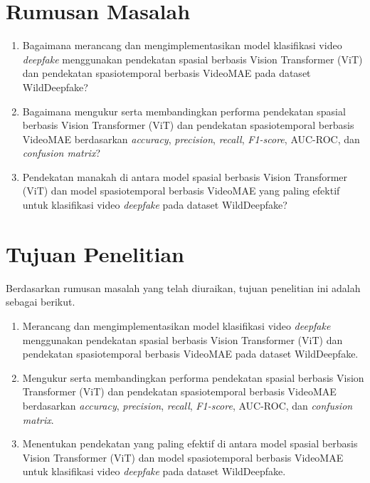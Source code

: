 \section{Rumusan Masalah} \label{I.Rumusan Masalah}
\begin{enumerate}[noitemsep]
	\item Bagaimana merancang dan mengimplementasikan model klasifikasi video \textit{deepfake} menggunakan pendekatan spasial berbasis Vision Transformer (ViT) dan pendekatan spasiotemporal berbasis VideoMAE pada dataset WildDeepfake?
	\item Bagaimana mengukur serta membandingkan performa pendekatan spasial berbasis Vision Transformer (ViT) dan pendekatan spasiotemporal berbasis VideoMAE berdasarkan \textit{accuracy}, \textit{precision}, \textit{recall}, \textit{F1-score}, AUC-ROC, dan \textit{confusion matrix}?
	\item Pendekatan manakah di antara model spasial berbasis Vision Transformer (ViT) dan model spasiotemporal berbasis VideoMAE yang paling efektif untuk klasifikasi video \textit{deepfake} pada dataset WildDeepfake?
\end{enumerate}

\section{Tujuan Penelitian} \label{I.Tujuan}
Berdasarkan rumusan masalah yang telah diuraikan, tujuan penelitian ini adalah sebagai berikut. \par

\begin{enumerate}[noitemsep]
	\item Merancang dan mengimplementasikan model klasifikasi video \textit{deepfake} menggunakan pendekatan spasial berbasis Vision Transformer (ViT) dan pendekatan spasiotemporal berbasis VideoMAE pada dataset WildDeepfake.
	\item Mengukur serta membandingkan performa pendekatan spasial berbasis Vision Transformer (ViT) dan pendekatan spasiotemporal berbasis VideoMAE berdasarkan \textit{accuracy}, \textit{precision}, \textit{recall}, \textit{F1-score}, AUC-ROC, dan \textit{confusion matrix}.
	\item Menentukan pendekatan yang paling efektif di antara model spasial berbasis Vision Transformer (ViT) dan model spasiotemporal berbasis VideoMAE untuk klasifikasi video \textit{deepfake} pada dataset WildDeepfake.
\end{enumerate}

